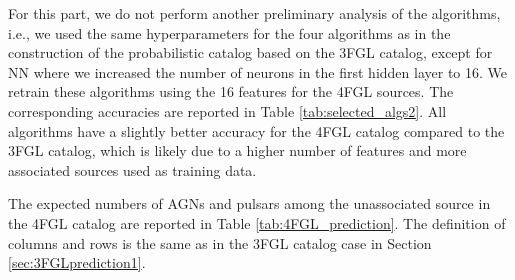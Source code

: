 For this part, we do not perform another preliminary analysis of the algorithms, i.e., we used the same hyperparameters for the four algorithms as in the construction of the probabilistic catalog based on the 3FGL catalog, except for NN where we increased the number of neurons in the first hidden layer to 16.
We retrain these algorithms using the 16 features for the 4FGL sources.
The corresponding accuracies are reported in Table \ref{tab:selected_algs2}.
All algorithms have a slightly better accuracy for the 4FGL catalog compared to the 3FGL catalog, which is likely due to a higher number of features and more associated sources used as training data. 


\begin{table}[!h]
    \vspace{0.2cm}
    \caption{Accuracy of the 4 selected algorithms on 4FGL DR1 associated data.}
    \label{tab:selected_algs2}
\end{table}

The expected numbers of AGNs and pulsars among the unassociated source in the 4FGL catalog are reported in Table \ref{tab:4FGL_prediction}.
The definition of columns and rows is the same as in the 3FGL catalog case in Section \ref{sec:3FGLprediction1}.

